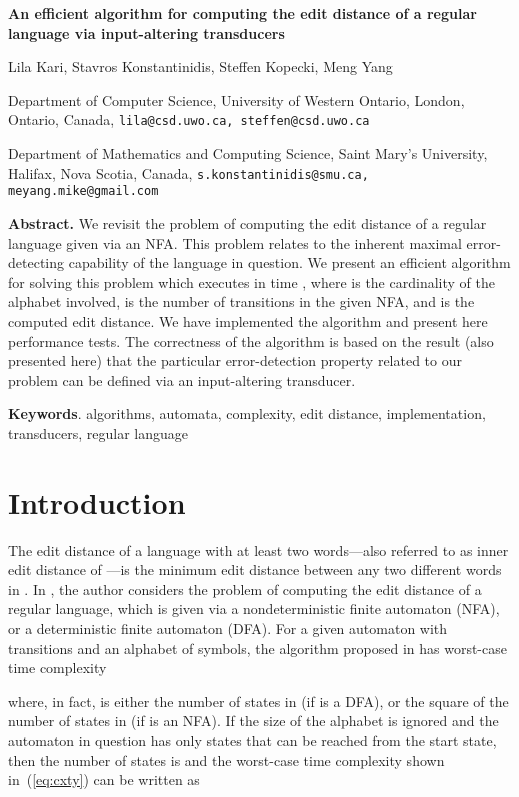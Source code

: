 \documentclass{article}
\theoremstyle{plain}
\theoremstyle{definition}
\theoremstyle{remark}
\newcommand\pssn{\par\smallskip\noindent}
\newcommand\pmsn{\par\medskip\noindent}
\newcommand\pbsn{\par\bigskip\noindent}
\begin{document}
\begin{center}
\textbf{\Large An efficient algorithm for computing the edit distance of a regular language via input-altering transducers}
\end{center}


{\large Lila Kari, Stavros Konstantinidis,
Steffen Kopecki, Meng Yang}
\pmsn
 Department of Computer Science, University of Western Ontario, London, Ontario, Canada,
\texttt{lila@csd.uwo.ca, steffen@csd.uwo.ca}
\pssn
 Department of Mathematics and Computing Science,
Saint Mary's University, Halifax, Nova Scotia, Canada,
\texttt{s.konstantinidis@smu.ca, meyang.mike@gmail.com}

\pbsn
\textbf{Abstract.}
We revisit the problem of computing the edit distance
of a regular language given via an NFA. This problem
relates to the inherent maximal error-detecting capability of the language in question. We present an efficient algorithm
for solving this problem which executes in time , where  is the cardinality of
the alphabet involved,  is
the number of transitions in the given NFA, and  is the
computed edit distance. We have implemented the algorithm
and present here performance tests. The correctness of the
algorithm is based on the result (also presented here) that
the particular error-detection property related to our problem can be defined via an input-altering transducer.

\pbsn
\textbf{Keywords}.
algorithms, automata, complexity, edit distance, implementation, transducers, regular language


\section{Introduction}\label{sec:intro}
The edit distance of a language  with at least two
words---also referred to as
inner edit distance of ---is the minimum edit distance
between any two different words in .
In \cite{Kon:2007}, the author considers the problem of
computing the edit distance of a regular language, which
is given via a nondeterministic finite automaton (NFA),
or a deterministic finite automaton (DFA).
For a given automaton  with
 transitions and an alphabet of  symbols, the algorithm proposed in \cite{Kon:2007} has
worst-case time complexity

where, in fact,  is either the number of states in  (if  is a DFA), or the square of the number of states in
 (if  is an NFA).
If the size of the alphabet is ignored and the automaton in question has only states that can be reached from the start state, then the number of states
is  and the worst-case time complexity shown in~(\ref{eq:cxty})
can be written as
\end{document}
